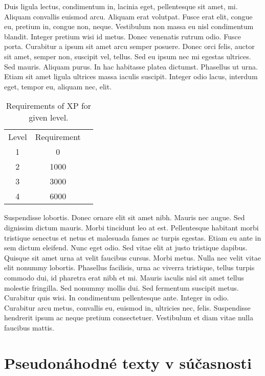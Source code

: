 \documentclass[thesismargins, thesislinespacing, twoside, openright, upjsfrontpage]{rnthesis}
\begin{document}

Duis ligula lectus, condimentum in, lacinia eget, pellentesque sit
amet, mi. Aliquam convallis euismod arcu. Aliquam erat volutpat.
Fusce erat elit, congue eu, pretium in, congue non, neque.
Vestibulum non massa eu nisl condimentum blandit. Integer pretium
wisi id metus. Donec venenatis rutrum odio. Fusce porta. Curabitur
a ipsum sit amet arcu semper posuere. Donec orci felis, auctor sit
amet, semper non, suscipit vel, tellus. Sed eu ipsum nec mi egestas
ultrices. Sed mauris. Aliquam purus. In hac habitasse platea
dictumst. Phasellus ut urna. Etiam sit amet ligula ultrices massa
iaculis suscipit. Integer odio lacus, interdum eget, tempor eu,
aliquam nec, elit.

\begin{table}
\begin{center}
\begin{tabular}{ccc}
Level & Requirement\\
1 & 0\\
2 & 1000\\
3 & 3000\\
4 & 6000
\end{tabular}
\end{center}
\caption{Requirements of XP for given level.}
\end{table}
Suspendisse lobortis. Donec ornare elit sit amet nibh. Mauris nec
augue. Sed dignissim dictum mauris. Morbi tincidunt leo at est.
Pellentesque habitant morbi tristique senectus et netus et
malesuada fames ac turpis egestas. Etiam eu ante in sem dictum
eleifend. Nunc eget odio. Sed vitae elit at justo tristique
dapibus. Quisque sit amet urna at velit faucibus cursus.
Morbi metus. Nulla nec velit vitae elit
nonummy lobortis. Phasellus facilisis, urna ac viverra tristique,
tellus turpis commodo dui, id pharetra erat nibh et mi. Mauris
iaculis nisl sit amet tellus molestie fringilla. Sed nonummy mollis
dui. Sed fermentum suscipit metus. Curabitur quis wisi. In
condimentum pellentesque ante. Integer in odio. Curabitur arcu
metus, convallis eu, euismod in, ultricies nec, felis. Suspendisse
hendrerit ipsum ac neque pretium consectetuer. Vestibulum et diam
vitae nulla faucibus mattis. 


\chapter{Pseudonáhodné texty v súčasnosti}
\end{document}
